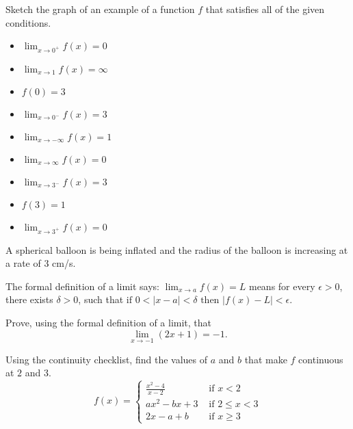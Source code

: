 \documentclass[12pt, addpoints]{exam/exam}
\newcommand{\1}{^{-1}}
\theoremstyle{plain}
\begin{document}
\begin{questions}
\thispagestyle{headandfoot}

\newpage
\question[18] %
Sketch the graph of an example of a function $f$ that satisfies all of the given conditions.
	\begin{itemize}
	\item $\lim_{x\to 0^+}f(x)=0$
	\item $\lim_{x\to 1}f(x)=\infty$		
	\item $f(0)=3$
	\item $\lim_{x\to 0^-}f(x)=3$
	\item $\lim_{x\to -\infty}f(x)=1$
	\item $\lim_{x\to \infty}f(x)=0$
	\item $\lim_{x\to 3^-}f(x)=3$
	\item $f(3)=1$
	\item $\lim_{x\to 3^+}f(x)=0$	
	\end{itemize}

\vfill	
\question%
A spherical balloon is being inflated and the radius of the balloon is increasing at a rate of 3 cm/s.
\vfill	

\newpage
\question[15] %
The formal definition of a limit says: $\lim_{x\to a}f(x)=L$ means for every $\epsilon>0$, there exists $\delta>0$, such that $\text{if }0<|x-a|<\delta \text{ then }|f(x)-L|<\epsilon$.

\vspace{1.5pc}
Prove, using the formal definition of a limit, that
\[
\lim_{x\to -1}(2x+1)=-1.
\]

\newpage
\question[20] %
Using the continuity checklist, find the values of $a$ and $b$ that make $f$ continuous at $2$ and $3$.
\[
f(x)=\begin{cases}
	\frac{x^2-4}{x-2} & \text{ if }x<2 \\
	ax^2-bx+3 & \text{ if }2\leq x<3 \\
	2x-a+b & \text{ if }x\geq 3
	\end{cases}
\]


\end{questions}
\end{document}
